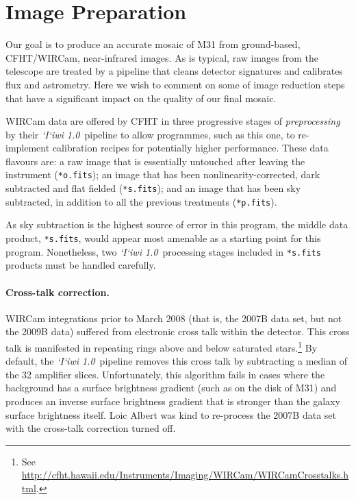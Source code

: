 \documentclass[iop]{emulateapj}
\newcommand{\sw}[1]{\textit{#1}} %
\newcommand{\iiwione}{\sw{`I`iwi 1.0}}
\begin{document}

\section{Image Preparation}
\label{sec:reduction}

Our goal is to produce an accurate mosaic of M31 from ground-based, CFHT/WIRCam, near-infrared images. As is typical, raw images from the telescope are treated by a pipeline that cleans detector signatures and calibrates flux and astrometry. Here we wish to comment on some of image reduction steps that have a significant impact on the quality of our final mosaic.

WIRCam data are offered by CFHT in three progressive stages of \emph{preprocessing} by their \iiwione\ pipeline to allow programmes, such as this one, to re-implement calibration recipes for potentially higher performance. These data flavours are: a raw image that is essentially untouched after leaving the instrument (\texttt{*o.fits}); an image that has been nonlinearity-corrected, dark subtracted and flat fielded (\texttt{*s.fits}); and an image that has been sky subtracted, in addition to all the previous treatments (\texttt{*p.fits}).

As sky subtraction is the highest source of error in this program, the middle data product, \texttt{*s.fits}, would appear most amenable as a starting point for this program. Nonetheless, two \iiwione\ processing stages included in \texttt{*s.fits} products must be handled carefully.

\paragraph{Cross-talk correction.} WIRCam integrations prior to March 2008 (that is, the 2007B data set, but not the 2009B data) suffered from electronic cross talk within the detector. This cross talk is manifested in repeating rings above and below saturated stars.\footnote{See \url{http://cfht.hawaii.edu/Instruments/Imaging/WIRCam/WIRCamCrosstalks.html}.} By default, the \iiwione\ pipeline removes this cross talk by subtracting a median of the 32 amplifier slices. Unfortunately, this algorithm fails in cases where the background has a surface brightness gradient (such as on the disk of M31) and produces an inverse surface brightness gradient that is stronger than the galaxy surface brightness itself. Loic Albert was kind to re-process the 2007B data set with the cross-talk correction turned off.
\end{document}
